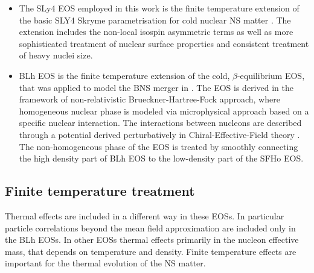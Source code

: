 \begin{itemize}
    \item The SLy4 \ac{EOS} employed in this work is the finite temperature extension \citep{daSilvaSchneider:2017jpg}
    of the basic SLY4 Skryme parametrisation for cold nuclear \ac{NS} matter \citep{Douchin:2001sv}.
    The extension includes the non-local isospin asymmetric terms as well as more sophisticated 
    treatment of nuclear surface properties and consistent treatment of heavy nuclei size. 
    \item BLh \ac{EOS} \citep{Logoteta:2020yxf} is the
    finite temperature extension of the cold, $\beta$-equilibrium \ac{EOS}, \citep{Bombaci:2018ksa}
    that was applied to model the \ac{BNS} merger in \citet{Endrizzi:2018uwl}.
    The \ac{EOS} is derived in the framework of non-relativistic Brueckner-Hartree-Fock approach,
    where homogeneous nuclear phase is modeled via 
    microphysical approach based on a specific nuclear interaction.
    The interactions between nucleons are described through a potential derived perturbatively 
    in Chiral-Effective-Field theory \citep{Machleidt:2011zz}.
    The non-homogeneous phase of the \ac{EOS} is treated by smoothly connecting the high density part of 
    BLh \ac{EOS} to the low-density part of the SFHo \ac{EOS}.
\end{itemize}



\subsection{Finite temperature treatment}

Thermal effects are included in a different way in these \acp{EOS}. 
In particular particle correlations beyond the mean field approximation are included only in the BLh \acp{EOS}.
In other \acp{EOS} thermal effects primarily in the nucleon effective mass, that depends on temperature and density.
Finite temperature effects are important for the thermal evolution of the NS matter.

